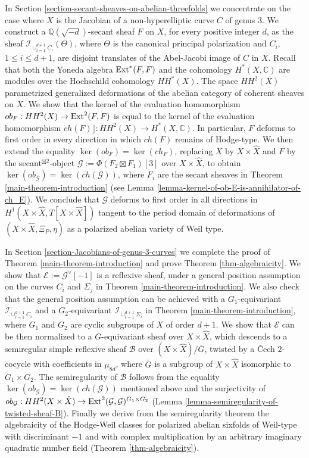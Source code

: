 \documentclass[12pt]{amsart}
\numberwithin{equation}{subsection}
\theoremstyle{plain}
\theoremstyle{definition}
\newcommand{\B}{{\mathcal B}}
\newcommand{\CC}{{\mathbb C}}
\newcommand{\E}{{\mathcal E}}
\newcommand{\G}{{\mathcal G}}
\newcommand{\QQ}{{\mathbb Q}}
\newcommand{\Ext}{{\rm Ext}}
\newcommand{\Ideal}[1]{{\mathcal I}_{#1}}
\newcommand{\Contract}{\rfloor}
\begin{document}
In Section \ref{section-secant-sheaves-on-abelian-threefolds} we concentrate on the case where $X$ is the Jacobian of a non-hyperelliptic curve $C$ of genus $3$.
We construct a $\QQ(\sqrt{-d})$-secant sheaf $F$ on $X$, for every positive integer $d$, as the sheaf $\Ideal{\cup_{i=1}^{d+1}C_i}(\Theta)$,
where $\Theta$ is the canonical principal polarization and $C_i$, $1\leq i\leq d+1$, are disjoint translates of the Abel-Jacobi image of $C$ in $X$. Recall that both the Yoneda algebra $\Ext^*(F,F)$ and the cohomology $H^*(X,\CC)$ are modules over the Hochschild cohomology $HH^*(X)$. The space $HH^2(X)$ parametrized generalized deformations of the abelian category of coherent sheaves on $X$. We show that the kernel of the evaluation homomorphism 
$ob_F:HH^2(X)\rightarrow \Ext^2(F,F)$ is equal to the kernel of the evaluation homomorphism $ch(F)\Contract:HH^2(X)\rightarrow H^*(X,\CC)$. In particular, 
$F$ deforms to first order in every direction in which $ch(F)$ remains of Hodge-type. 
We then extend the equality $\ker(ob_F)=\ker(ch_F)$, replacing $X$ by $X\times\hat{X}$ and $F$ by the secant$^{\boxtimes 2}$-object
$\G:=\Phi(F_2\boxtimes F_1)[3]$ over $X\times\hat{X}$, to obtain 
$\ker(ob_{\G})=\ker(ch(\G))$, where $F_i$ are the secant sheaves in Theorem \ref{main-theorem-introduction} (see Lemma \ref{lemma-kernel-of-ob-E-is-annihilator-of-ch_E}).
We conclude that $\G$ deforms to first order in all directions in $H^1(X\times\hat{X},T[X\times\hat{X}])$ tangent to the period domain of deformations of $(X\times\hat{X},\Xi_P,\eta)$ as a polarized abelian variety of Weil type.


In Section \ref{section-Jacobians-of-genus-3-curves} we complete the proof of Theorem \ref{main-theorem-introduction} and prove Theorem \ref{thm-algebraicity}. We show that $\E:=\G^\vee[-1]$ is a reflexive sheaf, under a general position assumption on the curves $C_i$ and $\Sigma_j$ in Theorem \ref{main-theorem-introduction}. We also check that the general position assumption can be achieved with a $G_1$-equivariant $\Ideal{\cup_{i=1}^{d+1}C_i}$
and a $G_2$-equivariant $\Ideal{\cup_{i=1}^{d+1}\Sigma_i}$ in Theorem \ref{main-theorem-introduction}, where $G_1$ and $G_2$ are cyclic subgroups of $X$ of order $d+1$. We show that $\E$ can be then normalized to a $\bar{G}$-equivariant sheaf over $X\times\hat{X}$, which descends to a semiregular simple reflexive  sheaf $\B$ over $(X\times\hat{X})/\bar{G}$, twisted by a \v{C}ech $2$-cocycle with coefficients in $\mu_{8d}$, where $\bar{G}$ is a subgroup of $X\times\hat{X}$ isomorphic to $G_1\times G_2$. The semiregularity of $\B$ follows from the equality $\ker(ob_{\G})=\ker(ch(\G))$ mentioned above and the surjectivity of $ob_\G:HH^2(X\times\hat{X})\rightarrow \Ext^2(\G,\G)^{G_1\times G_2}$ (Lemma \ref{lemma-semiregularity-of-twisted-sheaf-B}).
Finally we derive from the semiregularity theorem 
the algebraicity of the Hodge-Weil classes for 
polarized abelian sixfolds of Weil-type with discriminant $-1$ and with complex multiplication by an arbitrary imaginary quadratic number field (Theorem \ref{thm-algebraicity}). 
\end{document}
